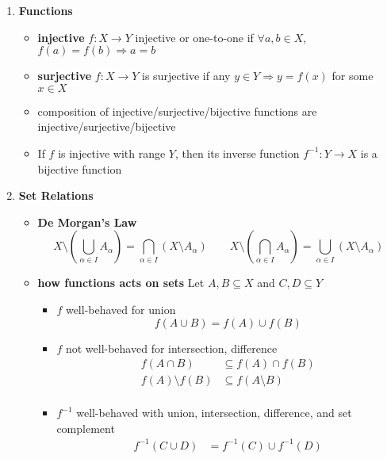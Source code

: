 \documentclass[10.5pt]{article}
\begin{document}
\tableofcontents
\newpage


\begin{enumerate}
    \item \textbf{Functions}
    \begin{itemize}
        \item \textbf{injective} $f:X\to Y$ injective or one-to-one if $\forall a,b\in X$, $f(a) = f(b) \Rightarrow a=b$
        \item \textbf{surjective} $f:X\to Y$ is surjective if any $y \in Y \Rightarrow y = f(x)$ for some $x\in X$
        \item composition of injective/surjective/bijective functions are injective/surjective/bijective
        \item If $f$ is injective with range $Y$, then its inverse function $f^{-1}: Y\to X$ is a bijective function
    \end{itemize}
    \item \textbf{Set Relations}
    \begin{itemize}
        \item \textbf{De Morgan's Law}
        \[
            X \setminus \left( \bigcup_{\alpha \in I} A_{\alpha} \right)
            = \bigcap_{\alpha \in I} \left( X \setminus A_{\alpha} \right)
            \qquad 
            X \setminus \left( \bigcap_{\alpha \in I} A_{\alpha} \right)
            = \bigcup_{\alpha \in I} \left( X \setminus A_{\alpha} \right)
        \]
        \item \textbf{how functions acts on sets} Let $A,B\subseteq X$ and $C,D\subseteq Y$
        \begin{itemize}
            \item $f$ well-behaved for union
            \[
                f(A\cup B) = f(A) \cup f(B)    
            \]
            \item $f$ not well-behaved for intersection, difference
            \begin{align*}
                f(A\cap B) &\subseteq f(A) \cap f(B) \\
                f(A) \setminus f(B) &\subseteq f(A\setminus B) \\
            \end{align*}
            \item $f^{-1}$ well-behaved with union, intersection, difference, and set complement
            \begin{align*}
                f^{-1} (C\cup D) 
                &= f^{-1}(C) \cup f^{-1}(D) \\

\end{align*}
\end{itemize}
\end{itemize}
\end{enumerate}
\end{document}
